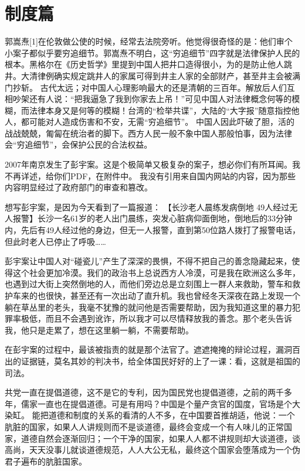 \chapter{制度篇}

郭嵩焘[1]在伦敦做公使的时候，经常去法院旁听。他觉得很奇怪的是：他们审个小案子都似乎要穷追细节。郭嵩焘不明白，这“穷追细节”四字就是法律保护人民的根本。黑格尔在《历史哲学》里提到中国人把井口造得很小，为的是防止他人跳井。大清律例确实规定跳井人的家属可得到井主人家的全部财产，甚至井主会被满门抄斩。
古代太远；对中国人心理影响最大的还是清朝的三百年。解放后人们互相吵架还有人说：“把我逼急了我到你家去上吊！”可见中国人对法律概念何等的模糊，而法律本身又是何等的模糊！台湾的“检举共谍”，大陆的“大字报”随意指控他人，都可能对人造成伤害和不安，无需“穷追细节”。
中国人因此吓破了胆，活的战战兢兢，匍匐在统治者的脚下。西方人民一般不象中国人那般怕事，因为法律会“穷追细节”，会保护公民的合法权益。

2007年南京发生了彭宇案。这是个极简单又极复杂的案子，想必你们有所耳闻。我不再详述，给你们PDF，在附件中。 我没有引用来自国内网站的内容，因为那些内容明显经过了政府部门的审查和篡改。

想写彭宇案，是因为今天看到了一篇报道：
【长沙老人晨练发病倒地 49人经过无人报警】长沙一名61岁的老人出门晨练，突发心脏病仰面倒地，倒地后的33分钟内，先后有49人经过他的身边，但无一人报警，直到第50位路人拨打了报警电话，但此时老人已停止了呼吸……

彭宇案让中国人对“碰瓷儿”产生了深深的畏惧，不得不把自己的善念隐藏起来，使得这个社会更加冷漠。我们的政治书上总说西方人冷漠，可是我在欧洲这么多年，也遇到过大街上突然倒地的人，而他们旁边总是立刻围上一群人来救助，警车和救护车来的也很快，甚至还有一次出动了直升机。我也曾经冬天深夜在路上发现一个躺在草丛里的老头，我毫不犹豫的就问他是否需要帮助，因为我知道这里的暴力犯罪率极低，而且不会遇到讹诈，所以我才可以尽情释放我的善念。那个老头告诉我，他只是走累了，想在这里躺一躺，不需要帮助。

在彭宇案的过程中，最该被指责的就是那个法官了。遮遮掩掩的辩论过程，漏洞百出的证据链，莫名其妙的判决书，给全体国民好好的上了一课：看，这就是祖国的司法。

共党一直在提倡道德，这不是它的专利，因为国民党也提倡道德，之前的两千多年，儒家一直也在提倡道德。可是有用吗？中国是个量产贪官的国度，官场是个大染缸。
能把道德和制度的关系的看清的人不多，在中国要首推胡适，他说：一个肮脏的国家，如果人人讲规则而不是谈道德，最终会变成一个有人味儿的正常国家，道德自然会逐渐回归；一个干净的国家，如果人人都不讲规则却大谈道德，谈高尚，天天没事儿就谈道德规范，人人大公无私，最终这个国家会堕落成为一个伪君子遍布的肮脏国家。

